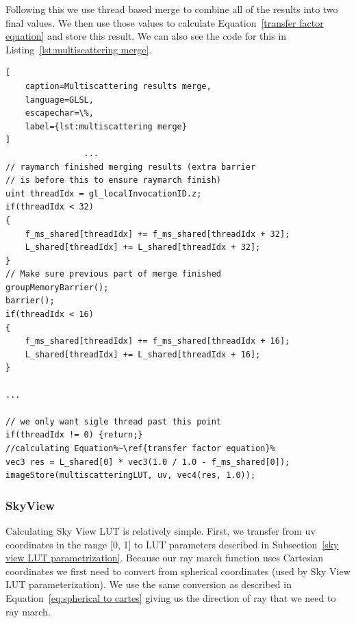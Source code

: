 \documentclass{ctuthesis}
\begin{document}
Following this we use thread based merge to combine all of the results into two final values. We 
then use those values to calculate Equation~\ref{transfer factor equation} and store this result.
We can also see the code for this in Listing~\ref{lst:multiscattering merge}.

\begin{lstlisting}[ 
    caption=Multiscattering results merge,
    language=GLSL,
    escapechar=\%,
    label={lst:multiscattering merge}
]
                ...
// raymarch finished merging results (extra barrier
// is before this to ensure raymarch finish)
uint threadIdx = gl_localInvocationID.z;
if(threadIdx < 32)
{
    f_ms_shared[threadIdx] += f_ms_shared[threadIdx + 32];
    L_shared[threadIdx] += L_shared[threadIdx + 32];
}
// Make sure previous part of merge finished
groupMemoryBarrier();
barrier();
if(threadIdx < 16)
{
    f_ms_shared[threadIdx] += f_ms_shared[threadIdx + 16];
    L_shared[threadIdx] += L_shared[threadIdx + 16];
}

...

// we only want sigle thread past this point
if(threadIdx != 0) {return;}
//calculating Equation%~\ref{transfer factor equation}%
vec3 res = L_shared[0] * vec3(1.0 / 1.0 - f_ms_shared[0]);
imageStore(multiscatteringLUT, uv, vec4(res, 1.0));
\end{lstlisting}

\subsubsection{SkyView}
Calculating Sky View LUT is relatively simple. First, we transfer from uv
coordinates in the range [0, 1] to LUT parameters described in Subsection~\ref{sky view LUT parametrization}.
Because our ray march function uses Cartesian coordinates we first need to convert from spherical coordinates
(used by Sky View LUT parameterization). We use the same conversion as described in 
Equation~\ref{eq:spherical to cartes} giving us the direction of ray that we need to ray march. 
\end{document}
